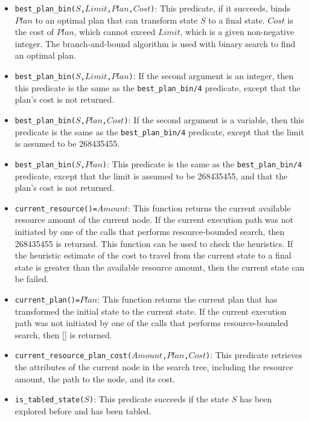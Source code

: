 \begin{itemize}
\item \texttt{best\_plan\_bin($S$,$Limit$,$Plan$,$Cost$)}: 
This predicate, if it succeeds, binds $Plan$ to an optimal plan that can transform state $S$ to a final state. $Cost$ is the cost of $Plan$, which cannot exceed $Limit$, which is a given non-negative integer. The branch-and-bound algorithm is used with binary search to find an optimal plan.

\item \texttt{best\_plan\_bin($S$,$Limit$,$Plan$)}: If the second argument is an integer, then this predicate is the same as the \texttt{best\_plan\_bin/4} predicate, except that the plan's cost is not returned. 

\item \texttt{best\_plan\_bin($S$,$Plan$,$Cost$)}: If the second argument is a variable, then this predicate is the same as the \texttt{best\_plan\_bin/4} predicate, except that the limit is assumed to be 268435455.

\item \texttt{best\_plan\_bin($S$,$Plan$)}: 
This predicate is the same as the \texttt{best\_plan\_bin/4} predicate, except that the limit is assumed to be 268435455, and that the plan's cost is not returned.

\item \texttt{current\_resource()=$Amount$}: This function returns the current available resource amount of the current node. If the current execution path was not initiated by one of the calls that performs resource-bounded search, then 268435455 is returned. This function can be used to check the heuristics. If the heuristic estimate of the cost to travel from the current state to a final state is greater than the available resource amount, then the current state can be failed.

\item \texttt{current\_plan()=$Plan$}: This function returns the current plan that has transformed the initial state to the current state. If the current execution path was not initiated by one of the calls that performs resource-bounded search, then [] is returned.

\item \texttt{current\_resource\_plan\_cost($Amount$,$Plan$,$Cost$)}: This predicate retrieves the attributes of the current node in the search tree, including the resource amount, the path to the node, and its cost.

\item \texttt{is\_tabled\_state($S$)}: This predicate succeeds if the state $S$ has been explored before and has been tabled.
\end{itemize}

